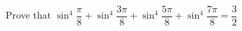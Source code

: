 
%
%
%
%
% 
% 
\question Prove that $\sin^4\dfrac{\pi}{8} + \sin^4\dfrac{3\pi}{8} + \sin^4\dfrac{5\pi}{8} + \sin^4\dfrac{7\pi}{8} = \dfrac{3}{2}$

\insertQR[-30pt]{}

\ifprintanswers
\fi 

